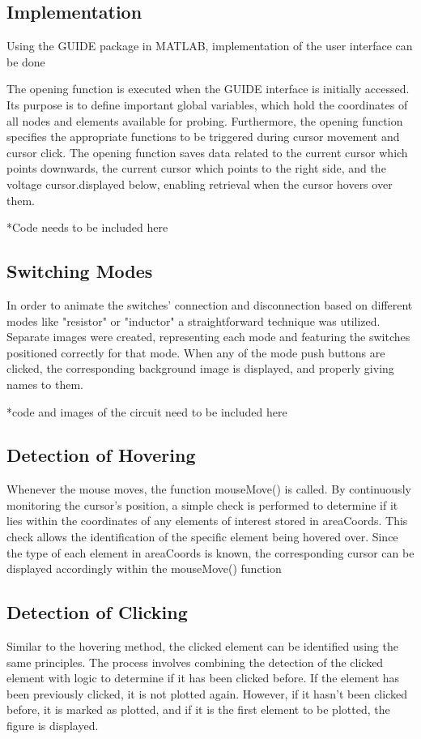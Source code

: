 \subsection{Implementation}
Using the GUIDE package in MATLAB, implementation of the user interface can be done 

The opening function is executed when the GUIDE interface is initially accessed. Its purpose is to define important global variables,  which hold the coordinates of all nodes and elements available for probing. Furthermore, the opening function specifies the appropriate functions to be triggered during cursor movement  and cursor click. The opening function saves data related to the current cursor which points downwards, the current cursor which points to the right side, and the voltage cursor.displayed below, enabling retrieval when the cursor hovers over them.


*Code needs to be included here


\subsection{Switching Modes}
In order to animate the switches' connection and disconnection based on different modes like "resistor" or "inductor" a straightforward technique was utilized. Separate images were created, representing each mode and featuring the switches positioned correctly for that mode. When any of the mode push buttons are clicked, the corresponding background image is displayed, and properly giving names to them. 

*code and images of the circuit need to be included here 

\subsection{Detection of Hovering}

Whenever the mouse moves, the function mouseMove() is called. By continuously monitoring the cursor's position, a simple check is performed to determine if it lies within the coordinates of any elements of interest stored in areaCoords. This check allows the identification of the specific element being hovered over. Since the type of each element in areaCoords is known, the corresponding cursor can be displayed accordingly within the mouseMove() function

\subsection{Detection of Clicking}
Similar to the hovering method, the clicked element can be identified using the same principles. The process involves combining the detection of the clicked element with logic to determine if it has been clicked before. If the element has been previously clicked, it is not plotted again. However, if it hasn't been clicked before, it is marked as plotted, and if it is the first element to be plotted, the figure is displayed.

